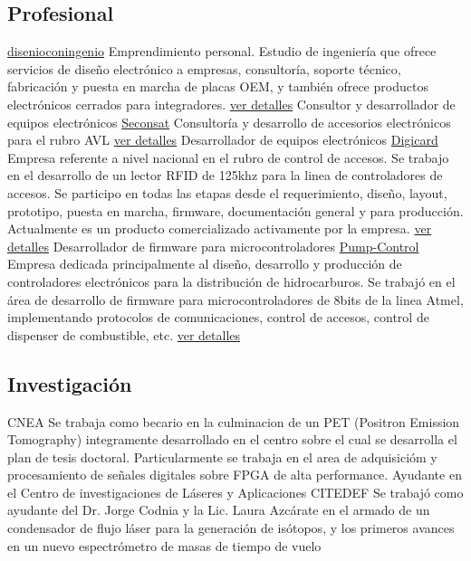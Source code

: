\documentclass[11pt,a4paper,sans]{moderncv} 	%
\begin{document}
\subsection{Profesional}
	 			{\href{www.disenioconingenio.com.ar} 	{disenioconingenio}} 	{}{}{Emprendimiento personal. Estudio de ingeniería que ofrece servicios de diseño electrónico a empresas, consultoría, soporte técnico, fabricación y puesta en marcha de placas OEM, y también ofrece productos electrónicos cerrados para integradores. \href{http://disenioconingenio.com.ar/producto.php?products_id=398}{ver detalles}}
		{Consultor y desarrollador de equipos electrónicos} 	{\href{www.seconsat.com} 		{Seconsat}} 		{}{}{Consultoría y desarrollo de accesorios electrónicos para el rubro AVL \href{http://disenioconingenio.com.ar/producto.php?products_id=392}{ver detalles}}
	 	{Desarrollador de equipos electrónicos} 		{\href{www.digicard.com.ar} 		{Digicard}} 		{}{}{Empresa referente a nivel nacional en el rubro de control de accesos. Se trabajo en el desarrollo de un lector RFID de 125khz para la linea de controladores de accesos. Se participo en todas las etapas desde el requerimiento, diseño, layout, prototipo, puesta en marcha, firmware, documentación general y para producción. Actualmente es un producto comercializado activamente por la empresa. \href{http://disenioconingenio.com.ar/producto.php?products_id=393}{ver detalles}}
	 	{Desarrollador de firmware para microcontroladores} 	{\href{www.pump-control.com.ar} 	{Pump-Control}} 	{}{}{Empresa dedicada principalmente al diseño, desarrollo y producción de controladores electrónicos para la distribución de hidrocarburos. Se trabajó en el área de desarrollo de firmware para microcontroladores de 8bits de la linea Atmel, implementando protocolos de comunicaciones, control de accesos, control de dispenser de combustible, etc. \href{http://disenioconingenio.com.ar/producto.php?products_id=391}{ver detalles}}

	\subsection{Investigación}
	 			{CNEA} 		{}{}{Se trabaja como becario en la culminacion de un PET (Positron Emission Tomography) integramente desarrollado en el centro sobre el cual se desarrolla el plan de tesis doctoral. Particularmente se trabaja en el area de adquisicióm y procesamiento de señales digitales sobre FPGA de alta performance.}
		{Ayudante en el Centro de investigaciones de Láseres y Aplicaciones} 	{CITEDEF} 	{}{}{Se trabajó como ayudante del Dr. Jorge Codnia y la Lic. Laura Azcárate en el armado de un condensador de flujo láser para la generación de isótopos, y los primeros avances en un nuevo espectrómetro de masas de tiempo de vuelo}
\end{document}
